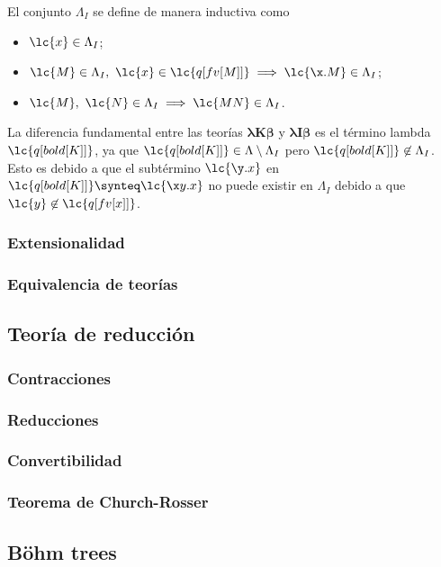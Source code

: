El conjunto \(\Lambda_{I}\) se define de manera inductiva como
\begin{itemize}
\item \(\lc{x} \in \Lambda_{I}\);
\item \(\lc{M}\in \Lambda_{I},\ \lc{x} \in \lc{q[fv[M]]} \implies \lc{\x.M} \in
  \Lambda_{I}\);
\item \(\lc{M},\ \lc{N} \in \Lambda_{I} \implies \lc{M N} \in \Lambda_{I}\).
\end{itemize}

La diferencia fundamental entre las teorías \(\boldsymbol{\lambda K \beta}\) y
\(\boldsymbol{\lambda I \beta}\) es el término lambda \(\lc{q[bold[K]]}\), ya que
\(\lc{q[bold[K]]} \in \Lambda \setminus \Lambda_{I}\) pero \(\lc{q[bold[K]]}
\not\in \Lambda_{I}\). Esto es debido a que el subtérmino \(\lc{\y.x}\) en
\(\lc{q[bold[K]]}\synteq \lc{\x y.x}\) no puede existir en \(\Lambda_{I}\)
debido a que \(\lc{y} \not\in \lc{q[fv[x]]}\). \\




\subsubsection{Extensionalidad}

\subsubsection{Equivalencia de teorías}

\subsection{Teoría de reducción}

\subsubsection{Contracciones}

\subsubsection{Reducciones}

\subsubsection{Convertibilidad}

\subsubsection{Teorema de Church-Rosser}

\subsection{Böhm trees}

